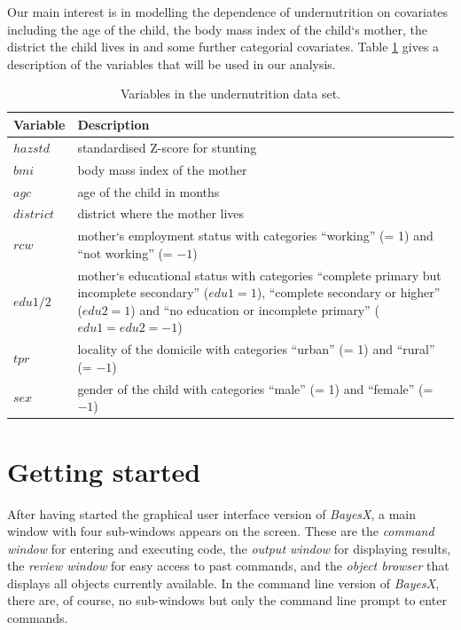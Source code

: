 Our main interest is in modelling the dependence of undernutrition on covariates including the age of the child, the body mass
index of the child`s mother, the district the child lives in and some further categorial covariates. Table \ref{step:zambiavar}
gives a description of the variables that will be used in our analysis.

{\footnotesize
\begin{table}[ht]
\begin{center}
\begin{tabular}{lp{12.5cm}}
 \hline
 {\bf Variable} & {\bf Description}\\
 \hline
 $\mathit hazstd$ & standardised Z-score for stunting\\
 $\mathit bmi$ & body mass index of the mother\\
 $\mathit agc$ & age of the child in months\\
 $\mathit district$ & district where the mother lives\\
 $\mathit rcw$ & mother`s employment status with categories ``working'' (= 1) and ``not working'' (= $-1$)\\
 $\mathit edu1/2$ & mother`s educational status with categories ``complete primary but incomplete secondary'' ($edu1=1$), ``complete secondary or higher'' ($edu2=1$) and ``no education or incomplete primary'' ($edu1=edu2=-1$)\\
 $\mathit tpr$ & locality of the domicile with categories ``urban'' (= 1) and ``rural'' (= $-1$)\\
 $\mathit sex$ & gender of the child with categories ``male'' (= 1) and  ``female'' (= $-1$)\\
 \hline
\end{tabular}
{\it\caption{Variables in the undernutrition data set. \label{step:zambiavar}}}
\end{center}
\end{table}}

\section{Getting started}\label{step:usage}

After having started the graphical user interface version of {\it BayesX}, a main window with four sub-windows appears on the
screen. These are the {\it command window} for entering and executing code, the {\it output window} for displaying results, the
{\it review window} for easy access to past commands, and the {\it object browser} that displays all objects currently
available. In the command line version of {\it BayesX}, there are, of course, no sub-windows but only the command line prompt to
enter commands.


